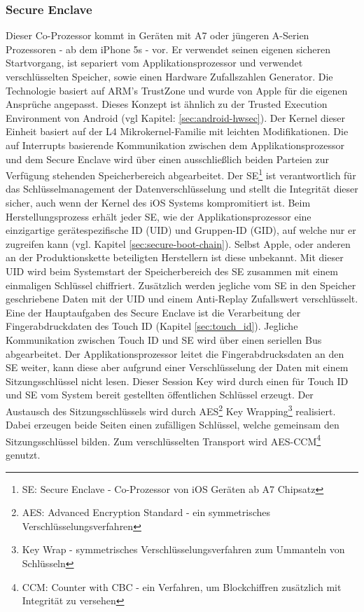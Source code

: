 	\subsubsection{Secure Enclave}\label{sec:secure_enclave}
		Dieser Co-Prozessor kommt in Geräten mit A7 oder jüngeren A-Serien
		Prozessoren - ab dem iPhone 5s - vor. Er verwendet seinen eigenen
		sicheren Startvorgang, ist separiert vom Applikationsprozessor und verwendet
		verschlüsselten Speicher, sowie einen Hardware Zufallszahlen Generator. Die
		Technologie basiert auf ARM's TrustZone \cite{TrustZone2015} und wurde von
		Apple für die eigenen Ansprüche angepasst. Dieses Konzept ist ähnlich zu der
		Trusted Execution Environment von Android (vgl Kapitel:
		\ref{sec:android-hwsec}). Der Kernel dieser Einheit basiert auf der L4
		Mikrokernel-Familie \cite{L4MicroKernel2015} mit leichten Modifikationen. Die
		auf Interrupts basierende Kommunikation zwischen dem Applikationsprozessor
		und dem Secure Enclave wird über einen ausschließlich beiden Parteien zur
		Verfügung stehenden Speicherbereich abgearbeitet. Der SE\footnote{SE: Secure
		Enclave - Co-Prozessor von iOS Geräten ab A7 Chipsatz} ist verantwortlich für
		das Schlüsselmanagement der Datenverschlüsselung und stellt die Integrität
		dieser sicher, auch wenn der Kernel des iOS Systems kompromitiert ist. Beim
		Herstellungsprozess erhält jeder SE, wie der Applikationsprozessor eine
		einzigartige gerätespezifische ID (UID) und Gruppen-ID (GID), auf welche nur
		er zugreifen kann (vgl. Kapitel \ref{sec:secure-boot-chain}).
		Selbst Apple, oder anderen an der Produktionskette beteiligten Herstellern
		ist diese unbekannt. Mit dieser UID wird beim
		Systemstart der Speicherbereich des SE zusammen mit einem einmaligen
		Schlüssel chiffriert.
		Zusätzlich werden jegliche vom SE in den Speicher geschriebene Daten mit der
		UID und einem Anti-Replay Zufallswert verschlüsselt. Eine der Hauptaufgaben
		des Secure Enclave ist die Verarbeitung der Fingerabdruckdaten des Touch ID
		(Kapitel \ref{sec:touch_id}).
		Jegliche Kommunikation zwischen Touch ID und SE wird über einen seriellen Bus
		abgearbeitet. Der Applikationsprozessor leitet die Fingerabdrucksdaten an den
		SE weiter, kann diese aber aufgrund einer Verschlüsselung der Daten mit einem
		Sitzungsschlüssel nicht lesen. Dieser Session Key wird durch einen
		für Touch ID und SE vom System bereit gestellten öffentlichen
		Schlüssel erzeugt. Der Austausch des Sitzungsschlüssels wird durch
		AES\footnote{AES: Advanced Encryption Standard - ein symmetrisches
		Verschlüsselungsverfahren} Key Wrapping\footnote{Key Wrap - symmetrisches
		Verschlüsselungsverfahren zum Ummanteln von Schlüsseln} realisiert. Dabei
		erzeugen beide Seiten einen zufälligen Schlüssel, welche gemeinsam den
		Sitzungsschlüssel bilden. Zum verschlüsselten Transport wird
		AES-CCM\footnote{CCM: Counter with CBC - ein Verfahren, um Blockchiffren
		zusätzlich mit Integrität zu versehen} genutzt.
		
